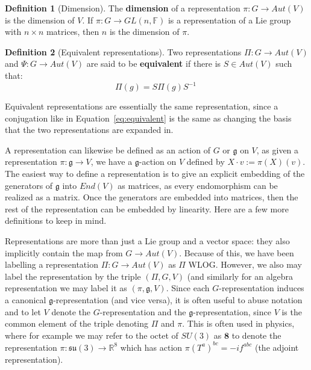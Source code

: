 \documentclass[11pt, oneside]{article}   	%
\theoremstyle{definition}
\newtheorem{definition}{Definition}[section]
\begin{document}
\begin{definition}[Dimension]
	The \textbf{dimension} of a representation $\pi : G\rightarrow Aut(V)$ is the dimension of $V$. 
	If $\pi : G\rightarrow GL(n, \mathbb F)$ is a representation of a Lie group with $n\times n$ matrices, 
	then $n$ is the dimension of $\pi$. 
\end{definition}

\begin{definition}[Equivalent representations]
	Two representations $\Pi : G\rightarrow Aut(V)$ and $\Psi : G\rightarrow Aut(V)$ are said to be 
	\textbf{equivalent} if there is $S\in Aut(V)$ such that:
	\begin{equation}
		\Pi(g) = S\Pi(g) S^{-1}~
		\label{eq:equivalent}
	\end{equation}
\end{definition}

Equivalent representations are essentially the same representation, since a conjugation like in 
Equation~\ref{eq:equivalent} is the same as changing the basis that the two representations are 
expanded in. 

 A representation can likewise be defined as an action of $G$ or $\mathfrak g$ on $V$, as given a 
representation $\pi : \mathfrak g\rightarrow V$, we have a $\mathfrak g$-action on $V$ defined 
by $X\cdot v := \pi(X)(v)$. The easiest way to define a representation is to give an explicit 
embedding of the generators of $\mathfrak g$ into $End(V)$ as matrices, as every endomorphism 
can be realized as a matrix. Once the generators are embedded into matrices, then the rest of 
the representation can be embedded by linearity. Here are a few more definitions to keep in mind. 

Representations are more than just a Lie group and a vector space: they also implicitly contain the 
map from $G\rightarrow Aut(V)$. Because of this, we have been labelling a representation $\Pi : G\rightarrow 
Aut(V)$ as $\Pi$ WLOG. However, we also may label the representation by the triple $(\Pi, G, V)$ 
(and similarly for an algebra representation we may label it as $(\pi, \mathfrak g, V)$. Since each 
$G$-representation induces a canonical $\mathfrak g$-representation (and vice versa), it is often 
useful to abuse notation and to let $V$ denote the $G$-representation and the $\mathfrak g$-representation, 
since $V$ is the common element of the triple denoting $\Pi$ and $\pi$. This is often used in physics, where 
for example we may refer to the octet of $SU(3)$ as $\textbf{8}$ to denote the representation $\pi : \mathfrak{su}(3)
\rightarrow\mathbb R^8$ which has action $\pi(T^a)^{bc} = - if^{abc}$ (the adjoint representation).  
\end{document}
